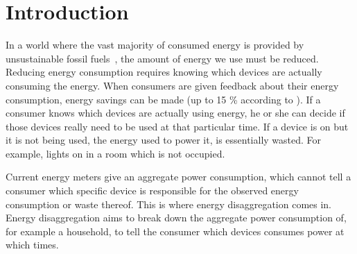 
\chapter{Introduction}
\label{chp:introduction}

\vspace{1\baselineskip}

\noindent


In a world where the vast majority of consumed energy is provided by unsustainable fossil fuels~\cite{kolter2011redd}, the amount of energy we use must be reduced.
Reducing energy consumption requires knowing which devices are actually consuming the energy.
When consumers are given feedback about their energy consumption, energy savings can be made (up to 15 \% according to \cite{darby2006effectiveness}).
If a consumer knows which devices are actually using energy, he or she can decide if those devices really need to be used at that particular time.
If a device is on but it is not being used, the energy used to power it, is essentially wasted.
For example, lights on in a room which is not occupied.



Current energy meters give an aggregate power consumption, which cannot tell a consumer which specific device is responsible for the observed energy consumption or waste thereof.
This is where energy disaggregation comes in.
Energy disaggregation aims to break down the aggregate power consumption of, for example a household, to tell the consumer which devices consumes power at which times.




